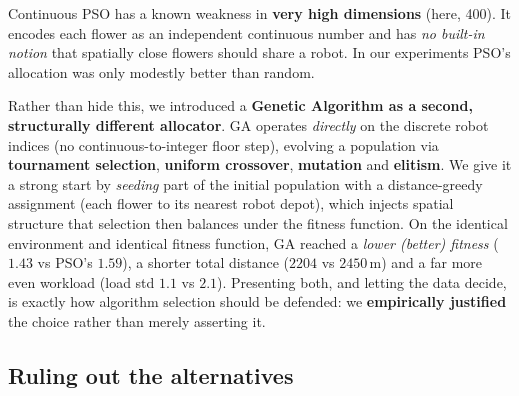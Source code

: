 \documentclass[11pt]{article}
\begin{document}
\begin{claim}
Continuous PSO has a known weakness in \textbf{very high dimensions} (here, 400).
It encodes each flower as an independent continuous number and has \emph{no
built-in notion} that spatially close flowers should share a robot. In our
experiments PSO's allocation was only modestly better than random.
\end{claim}

\begin{rebut}
Rather than hide this, we introduced a \textbf{Genetic Algorithm as a second,
structurally different allocator}. GA operates \emph{directly} on the discrete
robot indices (no continuous-to-integer floor step), evolving a population via
\textbf{tournament selection}, \textbf{uniform crossover}, \textbf{mutation} and
\textbf{elitism}. We give it a strong start by \emph{seeding} part of the initial
population with a distance-greedy assignment (each flower to its nearest robot
depot), which injects spatial structure that selection then balances under the
fitness function. On the identical environment and identical fitness function,
GA reached a \emph{lower (better) fitness} ($1.43$ vs PSO's $1.59$), a shorter
total distance ($2204$ vs $2450$\,m) and a far more even workload (load std
$1.1$ vs $2.1$). Presenting both, and letting the data decide, is exactly how
algorithm selection should be defended: we \textbf{empirically justified} the
choice rather than merely asserting it.
\end{rebut}

\subsection{Ruling out the alternatives}
\end{document}
